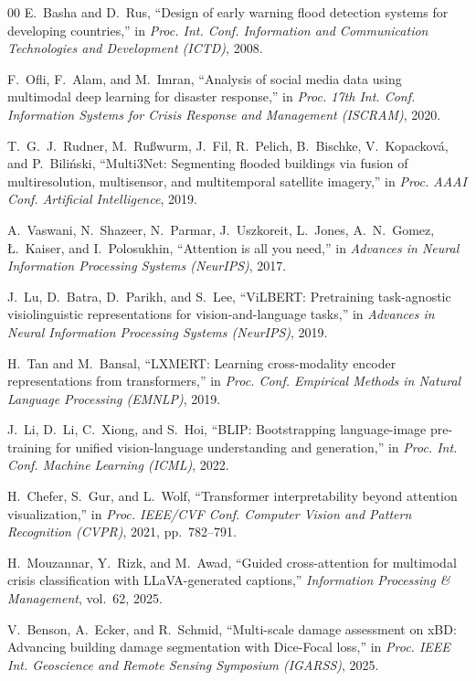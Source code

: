 \documentclass[journal]{IEEEtran}
\begin{document}
\begin{thebibliography}{00}
E.~Basha and D.~Rus, ``Design of early warning flood detection systems for developing countries,'' in \textit{Proc. Int. Conf. Information and Communication Technologies and Development (ICTD)}, 2008.

F.~Ofli, F.~Alam, and M.~Imran, ``Analysis of social media data using multimodal deep learning for disaster response,'' in \textit{Proc. 17th Int. Conf. Information Systems for Crisis Response and Management (ISCRAM)}, 2020.

T.~G.~J.~Rudner, M.~Ru\ss wurm, J.~Fil, R.~Pelich, B.~Bischke, V.~Kopackov\'{a}, and P.~Bili\'{n}ski, ``Multi3Net: Segmenting flooded buildings via fusion of multiresolution, multisensor, and multitemporal satellite imagery,'' in \textit{Proc. AAAI Conf. Artificial Intelligence}, 2019.

A.~Vaswani, N.~Shazeer, N.~Parmar, J.~Uszkoreit, L.~Jones, A.~N.~Gomez, \L.~Kaiser, and I.~Polosukhin, ``Attention is all you need,'' in \textit{Advances in Neural Information Processing Systems (NeurIPS)}, 2017.

J.~Lu, D.~Batra, D.~Parikh, and S.~Lee, ``ViLBERT: Pretraining task-agnostic visiolinguistic representations for vision-and-language tasks,'' in \textit{Advances in Neural Information Processing Systems (NeurIPS)}, 2019.

H.~Tan and M.~Bansal, ``LXMERT: Learning cross-modality encoder representations from transformers,'' in \textit{Proc. Conf. Empirical Methods in Natural Language Processing (EMNLP)}, 2019.

J.~Li, D.~Li, C.~Xiong, and S.~Hoi, ``BLIP: Bootstrapping language-image pre-training for unified vision-language understanding and generation,'' in \textit{Proc. Int. Conf. Machine Learning (ICML)}, 2022.

H.~Chefer, S.~Gur, and L.~Wolf, ``Transformer interpretability beyond attention visualization,'' in \textit{Proc. IEEE/CVF Conf. Computer Vision and Pattern Recognition (CVPR)}, 2021, pp.~782--791.

H.~Mouzannar, Y.~Rizk, and M.~Awad, ``Guided cross-attention for multimodal crisis classification with LLaVA-generated captions,'' \textit{Information Processing \& Management}, vol.~62, 2025.

V.~Benson, A.~Ecker, and R.~Schmid, ``Multi-scale damage assessment on xBD: Advancing building damage segmentation with Dice-Focal loss,'' in \textit{Proc. IEEE Int. Geoscience and Remote Sensing Symposium (IGARSS)}, 2025.


\end{thebibliography}
\end{document}
